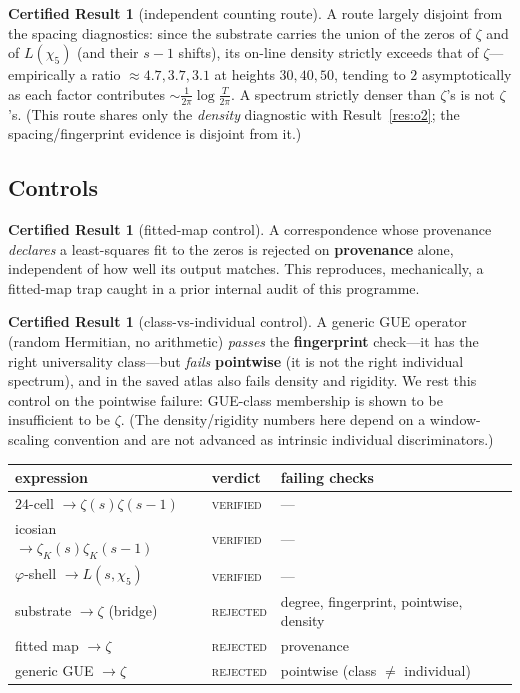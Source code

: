 \documentclass[11pt]{article}
\theoremstyle{definition}
\newtheorem{result}[theorem]{Certified Result}
\newcommand{\zetaK}{\zeta_{K}}
\begin{document}
\begin{result}[independent counting route]\label{res:o2b}
A route largely disjoint from the spacing diagnostics: since the substrate carries the
union of the zeros of $\zeta$ and of $L(\chi_5)$ (and their $s\!-\!1$ shifts), its
on-line density strictly exceeds that of $\zeta$---empirically a ratio $\approx 4.7,
3.7, 3.1$ at heights $30, 40, 50$, tending to $2$ asymptotically as each factor
contributes $\sim\tfrac1{2\pi}\log\tfrac{T}{2\pi}$. A spectrum strictly denser than
$\zeta$'s is not $\zeta$'s. (This route shares only the \emph{density} diagnostic with
Result~\ref{res:o2}; the spacing/fingerprint evidence is disjoint from it.)
\end{result}

\subsection{Controls}
\begin{result}[fitted-map control]\label{res:fit}
A correspondence whose provenance \emph{declares} a least-squares fit to the zeros is
rejected on \textbf{provenance} alone, independent of how well its output matches. This
reproduces, mechanically, a fitted-map trap caught in a prior internal audit of this
programme.
\end{result}
\begin{result}[class-vs-individual control]\label{res:gue}
A generic GUE operator (random Hermitian, no arithmetic) \emph{passes} the
\textbf{fingerprint} check---it has the right universality class---but \emph{fails}
\textbf{pointwise} (it is not the right individual spectrum), and in the saved atlas
also fails density and rigidity. We rest this control on the pointwise failure: GUE-class
membership is shown to be insufficient to be $\zeta$. (The density/rigidity numbers here
depend on a window-scaling convention and are not advanced as intrinsic individual
discriminators.)
\end{result}

\begin{center}\small
\begin{tabular}{llp{4.3cm}}
\hline
expression & verdict & failing checks \\
\hline
$24$-cell $\to \zeta(s)\zeta(s-1)$ & \textsc{verified} & --- \\
icosian $\to \zetaK(s)\zetaK(s-1)$ & \textsc{verified} & --- \\
$\varphi$-shell $\to L(s,\chi_5)$ & \textsc{verified} & --- \\
substrate $\to \zeta$ (bridge) & \textsc{rejected} & degree, fingerprint, pointwise, density \\
fitted map $\to \zeta$ & \textsc{rejected} & provenance \\
generic GUE $\to \zeta$ & \textsc{rejected} & pointwise (class $\ne$ individual) \\
\hline
\end{tabular}
\end{center}
\end{document}
